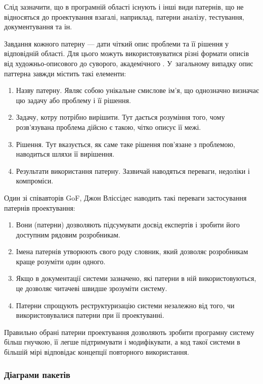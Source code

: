 \documentclass[../main.tex]{subfiles}
\begin{document}
		Слід зазначити, що в програмній області існують і інші види патернів, що не відносяться до проектування взагалі, наприклад, патерни аналізу, тестування, документування та ін.
		
		Завдання кожного патерну — дати чіткий опис проблеми та її рішення у відповідній області. Для цього можуть використовуватися різні формати описів від художньо-описового \cite{pattern_language} до суворого, академічного \cite{gof}. У~загальному випадку опис паттерна завжди містить такі елементи:
		
		\begin{enumerate}
			\item Назву патерну. Являє собою унікальне смислове ім'я, що однозначно визначає цю задачу або проблему і її рішення.
			\item Задачу, котру потрібно вирішити. Тут дається розуміння того, чому розв'язувана проблема дійсно є такою, чітко описує її межі.
			\item Рішення. Тут вказується, як саме таке рішення пов'язане з проблемою, наводиться шляхи її вирішення.
			\item Результати використання патерну. Зазвичай наводяться переваги, недоліки і компроміси.
		\end{enumerate}
		
		Один зі співавторів GoF, Джон Вліссідес \cite{patterns_application} наводить такі переваги застосування патернів проектування:
		
		\begin{enumerate}
			\item Вони (патерни) дозволяють підсумувати досвід експертів і зробити його доступним рядовим розробникам.
			\item Імена патернів утворюють свого роду словник, який дозволяє розробникам краще розуміти один одного.
			\item Якщо в документації системи зазначено, які патерни в ній використовуються, це дозволяє читачеві швидше зрозуміти систему.
			\item Патерни спрощують реструктуризацію системи незалежно від того, чи використовувалися патерни при її проектуванні.
		\end{enumerate}
		
		Правильно обрані патерни проектування дозволяють зробити програмну систему більш гнучкою, її легше підтримувати і модифікувати, а код такої системи в більшій мірі відповідає концепції повторного використання.
	
		\subsubsection{Діаграми пакетів}
		
\end{document}
